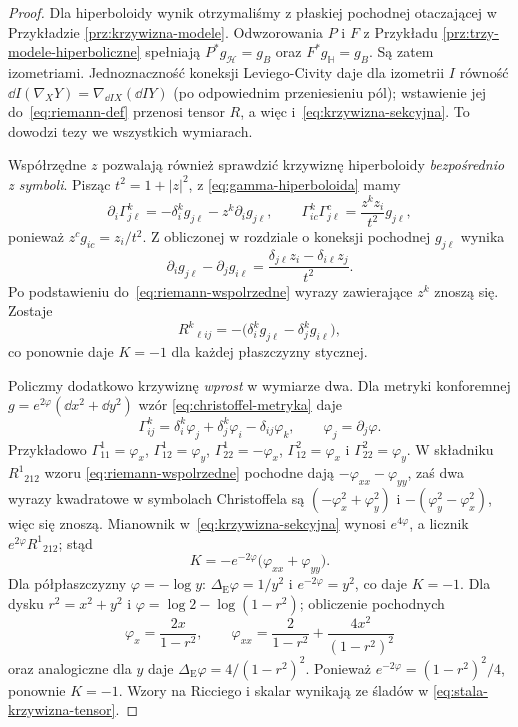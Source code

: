 \begin{proof}
Dla hiperboloidy wynik otrzymaliśmy z płaskiej
pochodnej otaczającej w Przykładzie
\ref{prz:krzywizna-modele}. Odwzorowania
$P$ i $F$ z Przykładu
\ref{prz:trzy-modele-hiperboliczne} spełniają
$P^*g_{\mathcal H}=g_B$ oraz
$F^*g_{\mathbb H}=g_B$. Są zatem izometriami.
Jednoznaczność koneksji Leviego-Civity daje dla
izometrii $I$ równość
$\dd I(\nabla_XY)=\nabla_{\dd I X}(\dd I Y)$
(po odpowiednim przeniesieniu pól); wstawienie
jej do~\eqref{eq:riemann-def} przenosi tensor
$R$, a więc i~\eqref{eq:krzywizna-sekcyjna}.
To dowodzi tezy we wszystkich wymiarach.

Współrzędne $z$ pozwalają również sprawdzić
krzywiznę hiperboloidy \emph{bezpośrednio z symboli}.
Pisząc $t^2=1+|z|^2$, z
\eqref{eq:gamma-hiperboloida} mamy
\[
 \partial_i\Gamma^k_{j\ell}
   =-\delta_i^k g_{j\ell}-z^k\partial_i g_{j\ell},
 \qquad
 \Gamma^k_{ic}\Gamma^c_{j\ell}
   =\frac{z^k z_i}{t^2}g_{j\ell},
\]
ponieważ $z^c g_{ic}=z_i/t^2$. Z obliczonej
w rozdziale o koneksji pochodnej $g_{j\ell}$ wynika
\[
 \partial_i g_{j\ell}-\partial_j g_{i\ell}
    =\frac{\delta_{j\ell}z_i
                   -\delta_{i\ell}z_j}{t^2}.
\]
Po podstawieniu do~\eqref{eq:riemann-wspolrzedne}
wyrazy zawierające $z^k$ znoszą się. Zostaje
\begin{equation}\label{eq:riemann-hiperboloida-wspolrzedne}
 R^k{}_{\ell i j}
   =-\bigl(\delta_i^k g_{j\ell}
                        -\delta_j^k g_{i\ell}\bigr),
\end{equation}
co ponownie daje $K=-1$ dla każdej
płaszczyzny stycznej.

Policzmy dodatkowo krzywiznę \emph{wprost}
w wymiarze dwa. Dla metryki konforemnej
$g=e^{2\varphi}(\dd x^2+\dd y^2)$ wzór
\eqref{eq:christoffel-metryka} daje
\[
 \Gamma^k_{ij}
   =\delta_i^k\varphi_j+\delta_j^k\varphi_i
       -\delta_{ij}\varphi_k,
 \qquad \varphi_j=\partial_j\varphi.
\]
Przykładowo
$\Gamma^1_{11}=\varphi_x$,
$\Gamma^1_{12}=\varphi_y$,
$\Gamma^1_{22}=-\varphi_x$,
$\Gamma^2_{12}=\varphi_x$ i
$\Gamma^2_{22}=\varphi_y$.
W składniku $R^1{}_{2 1 2}$ wzoru
\eqref{eq:riemann-wspolrzedne} pochodne dają
$-\varphi_{xx}-\varphi_{yy}$, zaś dwa wyrazy
kwadratowe w symbolach Christoffela są
$(-\varphi_x^2+\varphi_y^2)$ i
$-(\varphi_y^2-\varphi_x^2)$, więc się znoszą.
Mianownik w~\eqref{eq:krzywizna-sekcyjna}
wynosi $e^{4\varphi}$, a licznik
$e^{2\varphi}R^1{}_{2 1 2}$; stąd
\begin{equation}\label{eq:gauss-konforemna}
 K=-e^{-2\varphi}\bigl(\varphi_{xx}
                                  +\varphi_{yy}\bigr).
\end{equation}
Dla półpłaszczyzny $\varphi=-\log y$:
$\Delta_{\mathrm E}\varphi=1/y^2$
i $e^{-2\varphi}=y^2$, co daje $K=-1$.
Dla dysku $r^2=x^2+y^2$ i
$\varphi=\log2-\log(1-r^2)$; obliczenie pochodnych
\[
 \varphi_x=\frac{2x}{1-r^2},\qquad
 \varphi_{xx}=\frac{2}{1-r^2}
                  +\frac{4x^2}{(1-r^2)^2}
\]
oraz analogiczne dla $y$ daje
$\Delta_{\mathrm E}\varphi=4/(1-r^2)^2$.
Ponieważ $e^{-2\varphi}=(1-r^2)^2/4$,
ponownie $K=-1$. Wzory na Ricciego i skalar
wynikają ze śladów w
\eqref{eq:stala-krzywizna-tensor}.


\end{proof}
